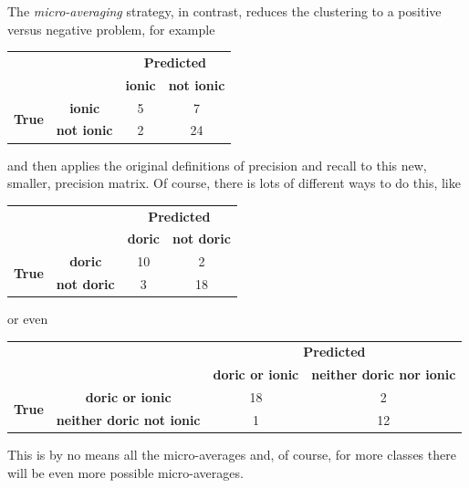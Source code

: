 \documentclass[12pt]{article}
\begin{document}
The \textsl{micro-averaging} strategy, in contrast, reduces the
clustering to a positive versus negative problem, for example
\begin{center}
\begin{tabular}{|c|c|c|c|}
\cline{3-4}
\multicolumn{1}{c}{}&\multicolumn{1}{c|}{}&\multicolumn{2}{c|}{\textbf{Predicted}} \\ \cline{3-4} 
\multicolumn{1}{c}{}&\multicolumn{1}{c|}{}& \textbf{ionic} & \textbf{not ionic} \\ \hline
\multirow{2}{*}{\textbf{True}}&
\textbf{ionic} & 5 & 7 \\ \cline{2-4}
&\textbf{not ionic} & 2 & 24 \\ \cline{1-4}
\end{tabular}
\end{center}
and then applies the original definitions of precision and recall to this new, smaller, precision matrix. Of course, there is lots of different ways to do this, like
\begin{center}
\begin{tabular}{|c|c|c|c|}
\cline{3-4}
\multicolumn{1}{c}{}&\multicolumn{1}{c|}{}&\multicolumn{2}{c|}{\textbf{Predicted}} \\ \cline{3-4} 
\multicolumn{1}{c}{}&\multicolumn{1}{c|}{}& \textbf{doric} & \textbf{not doric} \\ \hline
\multirow{2}{*}{\textbf{True}}&
\textbf{doric} & 10 & 2 \\ \cline{2-4}
&\textbf{not doric} & 3 & 18 \\ \cline{1-4}
\end{tabular}
\end{center}
or even
\begin{center}
\begin{tabular}{|c|c|c|c|}
\cline{3-4}
\multicolumn{1}{c}{}&\multicolumn{1}{c|}{}&\multicolumn{2}{c|}{\textbf{Predicted}} \\ \cline{3-4} 
\multicolumn{1}{c}{}&\multicolumn{1}{c|}{}& \textbf{doric or ionic} & \textbf{neither doric nor ionic} \\ \hline
\multirow{2}{*}{\textbf{True}}&
\textbf{doric or ionic} & 18 & 2 \\ \cline{2-4}
&\textbf{neither doric not ionic} & 1 & 12 \\ \cline{1-4}
\end{tabular}
\end{center}
This is by no means all the micro-averages and, of course, for more
classes there will be even more possible micro-averages.
\end{document}
